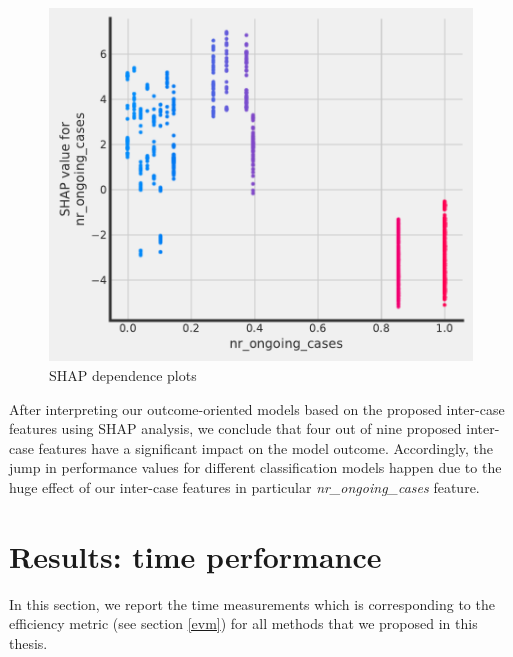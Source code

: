 \begin{figure}[!htbp]
	\includegraphics[width=\linewidth]{images/shap/pdp_nr_ongoing.pdf}
	\caption[SHAP dependence plots]{SHAP dependence plots}
	\label{fig:shappdp}
\end{figure}\hspace*{\fill}

After interpreting our outcome-oriented models based on the proposed inter-case features using SHAP analysis, we conclude that four out of nine proposed inter-case features have a significant impact on the model outcome. Accordingly, the jump in performance values for different classification models happen due to the huge effect of our inter-case features in particular \textit{nr\_ongoing\_cases} feature. 

\section{Results: time performance}
In this section, we report the time measurements which is corresponding to the efficiency metric (see section \ref{evm}) for all methods that we proposed in this thesis. 




